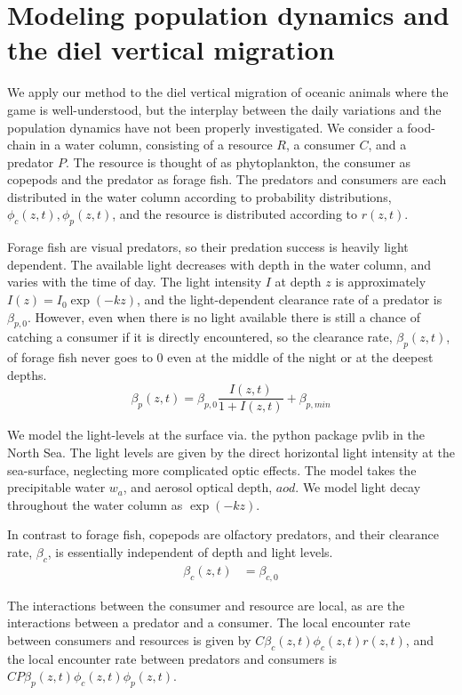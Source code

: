 
\section{Modeling population dynamics and the diel vertical migration}
We apply our method to the diel vertical migration of oceanic animals where the game is well-understood, but the interplay between the daily variations and the population dynamics have not been properly investigated. %
We consider a food-chain in a water column, consisting of a resource $R$, a consumer $C$, and a predator $P$. The resource is thought of as phytoplankton, the consumer as copepods and the predator as forage fish. The predators and consumers are each distributed in the water column according to probability distributions, $\phi_c(z,t),\phi_p(z,t)$, and the resource is distributed according to $r(z,t)$.

Forage fish are visual predators, so their predation success is heavily light dependent. The available light decreases with depth in the water column, and varies with the time of day.
The light intensity $I$ at depth $z$ is approximately $I(z) = I_0\exp(-kz)$, and the light-dependent clearance rate of a predator is $\beta_{p,0}$.  However, even when there is no light available there is still a chance of catching a consumer if it is directly encountered,  so the clearance rate, $\beta_p(z,t)$, of forage fish never goes to 0 even at the middle of the night or at the deepest depths.
\begin{equation*}
  \beta_p(z,t) = \beta_{p,0} \frac{I(z,t)}{1+I(z,t)} + \beta_{p,min}
\end{equation*}


We model the light-levels at the surface via. the python package pvlib \citep{holmgren2018pvlib} in the North Sea. The light levels are given by the direct horizontal light intensity at the sea-surface, neglecting more complicated optic effects. The model takes the precipitable water $w_a$, and aerosol optical depth, $aod$. We model light decay throughout the water column as $\exp(-kz)$.


In contrast to forage fish, copepods are olfactory predators, and their clearance rate, $\beta_c$, is essentially independent of depth and light levels.
\begin{align*}
	\beta_c(z,t) &=  \beta_{c,0}
\end{align*}

The interactions between the consumer and resource are local, as are the interactions between a predator and a consumer. The local encounter rate between consumers and resources is given by $C\beta_c(z,t)\phi_c(z,t)r(z,t)$, and the local encounter rate between predators and consumers is $CP\beta_p(z,t)\phi_c(z,t)\phi_p(z,t)$.

